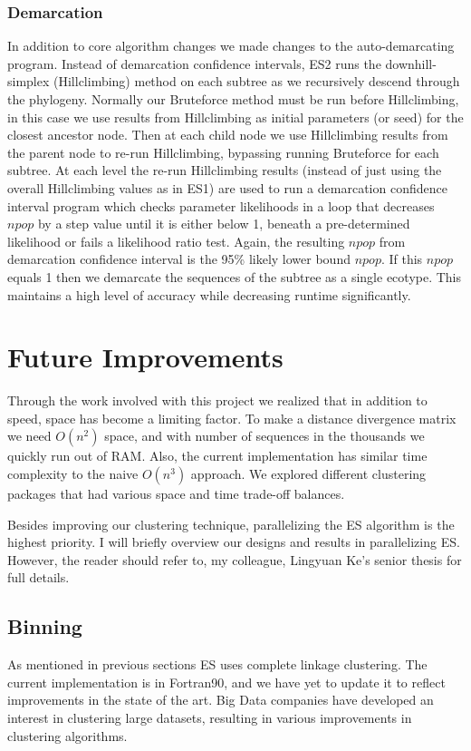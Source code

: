 \subsubsection*{Demarcation}
In addition to core algorithm changes we made changes to the auto-demarcating program.
Instead of demarcation confidence intervals, ES2 runs the downhill-simplex (Hillclimbing) method on each subtree as we recursively descend through the phylogeny.
Normally our Bruteforce method must be run before Hillclimbing, in this case we use results from Hillclimbing as initial parameters (or seed) for the closest ancestor node.
Then at each child node we use Hillclimbing results from the parent node to re-run Hillclimbing, bypassing running Bruteforce for each subtree.
At each level the re-run Hillclimbing results (instead of just using the overall Hillclimbing values as in ES1) are used to run a demarcation confidence interval program which checks parameter likelihoods in a loop that decreases $npop$ by a step value until it is either below 1, beneath a pre-determined likelihood or fails a likelihood ratio test.
Again, the resulting $npop$ from demarcation confidence interval is the 95\% likely lower bound $npop$.
If this $npop$ equals 1 then we demarcate the sequences of the subtree as a single ecotype.
This maintains a high level of accuracy while decreasing runtime significantly.

\section{Future Improvements}
Through the work involved with this project we realized that in addition to speed, space has become a limiting factor.
To make a distance divergence matrix we need $O(n^2)$ space, and with number of sequences in the thousands we quickly run out of RAM. Also, the current implementation has similar time complexity to the naive $O(n^3)$ approach.
We explored different clustering packages that had various space and time trade-off balances.

Besides improving our clustering technique, parallelizing the ES algorithm is the highest priority.
I will briefly overview our designs and results in parallelizing ES.
However, the reader should refer to, my colleague, Lingyuan Ke's senior thesis for full details.
\subsection*{Binning}
As mentioned in previous sections ES uses complete linkage clustering.
The current implementation is in Fortran90, and we have yet to update it to reflect improvements in the state of the art.
Big Data companies have developed an interest in clustering large datasets, resulting in various improvements in clustering algorithms.
